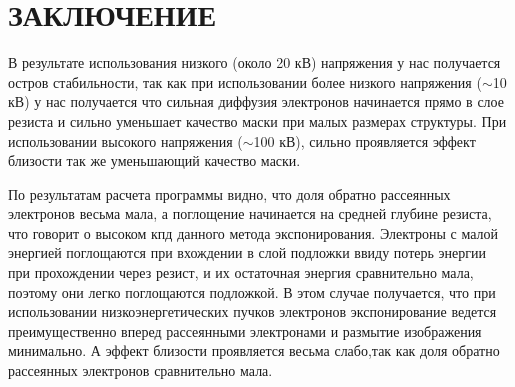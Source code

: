 \chapter*{ЗАКЛЮЧЕНИЕ}
В результате использования низкого (около 20 кВ) напряжения у нас получается остров стабильности,
так как при использовании более низкого напряжения (\(\sim\)10 кВ) у нас получается что сильная диффузия электронов начинается прямо в слое резиста и сильно уменьшает качество маски при малых размерах структуры.
При использовании высокого напряжения (\(\sim\)100 кВ), сильно проявляется эффект близости так же уменьшающий качество маски.

По результатам расчета программы видно, что доля обратно рассеянных электронов весьма мала, а поглощение начинается на средней глубине резиста, что говорит о высоком кпд данного метода экспонирования. Электроны с малой энергией поглощаются при вхождении в слой подложки ввиду потерь энергии при прохождении через резист, и их остаточная энергия сравнительно мала, поэтому они легко поглощаются подложкой. В этом случае получается, что при использовании низкоэнергетических пучков электронов экспонирование ведется преимущественно вперед рассеянными электронами и размытие изображения минимально. А эффект близости проявляется весьма слабо,так как доля обратно рассеянных электронов сравнительно мала.

